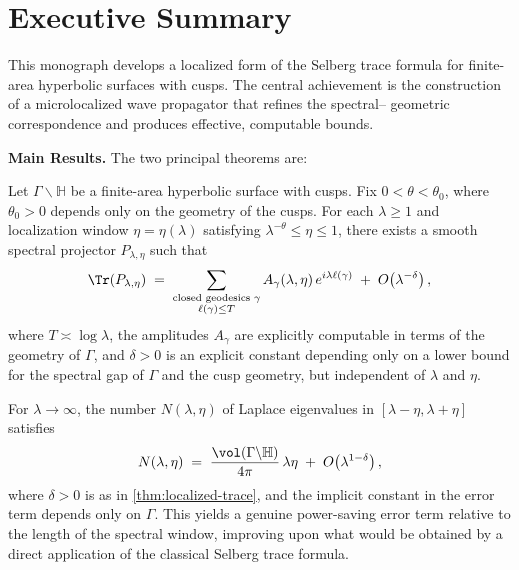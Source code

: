 \section*{Executive Summary}

This monograph develops a localized form of the Selberg trace formula for
finite-area hyperbolic surfaces with cusps. The central achievement is the
construction of a microlocalized wave propagator that refines the spectral–
geometric correspondence and produces effective, computable bounds.

\medskip

\noindent \textbf{Main Results.} The two principal theorems are:

\begin{theorem}\label{thm:localized-trace}
Let $\Gamma \backslash \mathbb{H}$ be a finite-area hyperbolic surface with
cusps. Fix $0<\theta<\theta_0$, where $\theta_0>0$ depends only on the
geometry of the cusps. For each $\lambda \geq 1$ and localization window
$\eta=\eta(\lambda)$ satisfying $\lambda^{-\theta}\leq \eta \leq 1$, there
exists a smooth spectral projector $P_{\lambda,\eta}$ such that
\[
  \Tr(P_{\lambda,\eta})
  \;=\;
  \sum_{\substack{\text{closed geodesics } \gamma \\ \ell(\gamma)\leq T}}
  A_\gamma(\lambda,\eta)\,e^{i\lambda \ell(\gamma)}
  \;+\;
  O\!\left(\lambda^{-\delta}\right),
\]
where $T \asymp \log \lambda$, the amplitudes $A_\gamma$ are explicitly
computable in terms of the geometry of $\Gamma$, and $\delta>0$ is an explicit
constant depending only on a lower bound for the spectral gap of $\Gamma$ and
the cusp geometry, but independent of $\lambda$ and $\eta$.
\end{theorem}

\begin{theorem}\label{thm:local-weyl}
For $\lambda \to \infty$, the number $N(\lambda,\eta)$ of Laplace eigenvalues
in $[\lambda-\eta,\lambda+\eta]$ satisfies
\[
  N(\lambda,\eta)
  \;=\; \frac{\vol(\Gamma \backslash \mathbb{H})}{4\pi}\,\lambda \eta
  \;+\; O\!\left(\lambda^{1-\delta}\right),
\]
where $\delta>0$ is as in \cref{thm:localized-trace}, and the implicit constant
in the error term depends only on $\Gamma$. This yields a genuine power-saving
error term relative to the length of the spectral window, improving upon what
would be obtained by a direct application of the classical Selberg trace
formula.
\end{theorem}

